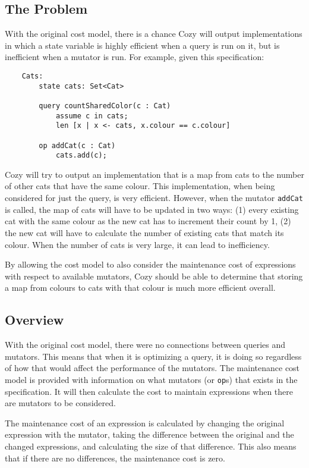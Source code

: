 \newcommand{\code}[1]{\texttt{#1}}

\subsection{The Problem}
With the original cost model, there is a chance Cozy will output implementations
in which a state variable is highly efficient when a query is run on it, but
is inefficient when a mutator is run. For example, given this specification:

\begin{lstlisting}
    Cats:
        state cats: Set<Cat>

        query countSharedColor(c : Cat)
            assume c in cats;
            len [x | x <- cats, x.colour == c.colour]

        op addCat(c : Cat)
            cats.add(c);
\end{lstlisting}

Cozy will try to output an implementation that is a map from cats to the number
of other cats that have the same colour. This implementation, when being
considered for just the query, is very efficient. However, when the mutator
\code{addCat} is called, the map of cats will have to be updated in two ways:
(1) every existing cat with the same colour as the new cat has to increment their
count by 1, (2) the new cat will have to calculate the number of existing cats
that match its colour. When the number of cats is very large, it can lead to
inefficiency.

By allowing the cost model to also consider the maintenance cost of expressions
with respect to available mutators, Cozy should be able to determine that storing
a map from colours to cats with that colour is much more efficient overall.

\subsection{Overview}
With the original cost model, there were no connections between queries and
mutators. This means that when it is optimizing a query, it is doing so
regardless of how that would affect the performance of the mutators.
The maintenance cost model is provided with information on what mutators (or
\code{op}s) that exists in the specification. It will then calculate the cost to
maintain expressions when there are mutators to be considered.

The maintenance cost of an expression is calculated by changing the original
expression with the mutator, taking the difference between the original and the
changed expressions, and calculating the size of that difference. This also
means that if there are no differences, the maintenance cost is zero.

